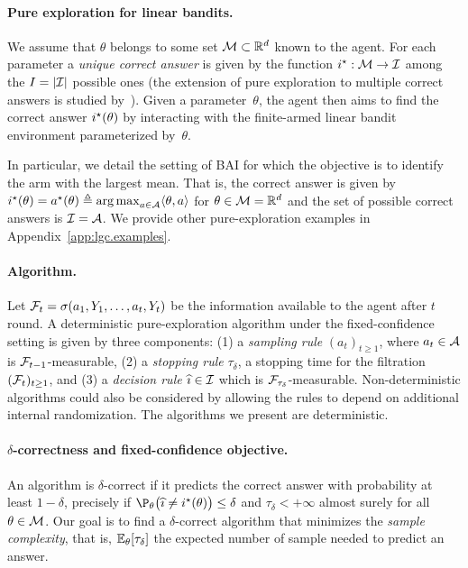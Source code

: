 \paragraph{Pure exploration for linear bandits.}
We assume that $\theta$ belongs to some set $\mathcal{M}\subset\mathbb{R}^d$ known to the agent. %
For each parameter a \emph{unique correct answer} is given by the function $i^\star: \mathcal{M} \to \mathcal{I}$ among the $I = |\mathcal{I}|$ possible ones (the extension of pure exploration to multiple correct answers is studied by~\citealt{degenne2019pure}). Given a parameter~$\theta$, the agent then aims to find the correct answer $i^\star(\theta)$ by interacting with the finite-armed linear bandit environment parameterized by~$\theta$.

In particular, we detail the setting of BAI for which the objective is to identify the arm with the largest mean. That is, the correct answer is given by $i^\star(\theta)=a^\star(\theta)\triangleq \operatorname*{arg\,max}_{a\in\mathcal{A}} \langle\theta,a\rangle$ for $\theta\in\mathcal{M} = \mathbb{R}^d$ and the set of possible correct answers is $\mathcal{I} = \mathcal{A}$. We provide other pure-exploration examples in Appendix~\ref{app:lgc.examples}.

\paragraph{Algorithm.}
Let $\mathcal{F}_{t}=\sigma (a_1,Y_1,\ldots, a_t,Y_t)$ be the information available to the agent after $t$ round. A deterministic pure-exploration algorithm under the fixed-confidence setting is given by three components: (1) a \emph{sampling rule} $(a_t)_{t\geq 1}$, where $a_t\in\mathcal{A}$ is $\mathcal{F}_{t-1}$-measurable, (2) a \emph{stopping rule} $\tau_\delta$, a stopping time for the filtration $(\mathcal{F}_t)_{t\geq 1}$, and (3) a \emph{decision rule} $\widehat{\imath}\in \mathcal{I}$ which is $\mathcal{F}_{\tau_\delta}$-measurable.
Non-deterministic algorithms could also be considered by allowing the rules to depend on additional internal randomization. The algorithms we present are deterministic.

\paragraph{$\delta$-correctness and fixed-confidence objective.}
An algorithm is $\delta$-correct if it predicts the correct answer with probability at least $1-\delta$, precisely if $\P_\theta \big(\hi \neq \istar(\theta)\big) \leq \delta$ and $\tau_\delta < +\infty$ almost surely for all $\theta \in\mathcal{M}$. Our goal is to find a $\delta$-correct algorithm that minimizes the \emph{sample complexity}, that is,  $\mathbb{E}_\theta[\tau_\delta]$ the expected number of sample needed to predict an answer.

